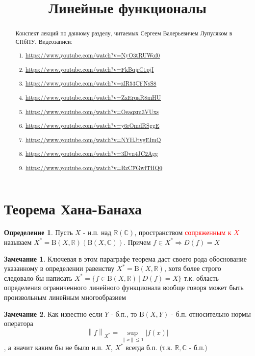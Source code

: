 \documentclass[12pt,a4paper]{article}
\title{Линейные функционалы}
\date{}
\theoremstyle{definition}
\newtheorem{definition}{Определение}[section]
\newtheorem{corollarydf}{Замечание}[definition]
\newcommand{\Real}{\mathbb{R}}
\newcommand{\Cmplx}{\mathbb{C}}
\newcommand{\norm}[1]{\left\lVert#1\right\rVert}
\newcommand{\setbuild}[2]{\{#1\:|\:#2\}}
\newcommand{\bounded}[2]{\textrm{B}(#1, #2)}
\begin{document}
\maketitle

\begin{abstract}
	Конспект лекций по данному разделу, читаемых Сергеем Валерьевичем Лупуляком в СПбПУ. Видеозаписи:
	\begin{enumerate}
		\item \url{https://www.youtube.com/watch?v=NyO3tRUWof0}
		\item \url{https://www.youtube.com/watch?v=FkBqjrC1pjI}
		\item \url{https://www.youtube.com/watch?v=zlR53CFNsS8}
		\item \url{https://www.youtube.com/watch?v=ZxErqaR8mHU}
		\item \url{https://www.youtube.com/watch?v=Oeaqzm3VUxs}
		\item \url{https://www.youtube.com/watch?v=y6rOmdRSggE}
		\item \url{https://www.youtube.com/watch?v=NYHJtvgEImQ}
		\item \url{https://www.youtube.com/watch?v=3Dvn4JC2Agg}
		\item \url{https://www.youtube.com/watch?v=RzCFGwlTHQ0}
	\end{enumerate}
	
\end{abstract}

\newpage

\section{Теорема Хана-Банаха}

\begin{definition}
	Пусть $X$ - н.п. над $\Real(\Cmplx)$, пространством \textcolor{red}{сопряженным к $X$} называем $X^*=\bounded{X}{\Real}(\bounded{X}{\Cmplx})$. Причем $f\in X^*\Rightarrow D(f)=X$
\end{definition}
\begin{corollarydf}
	Ключевая в этом параграфе теорема даст своего рода обоснование указанному в определении равенству $X^*=\bounded{X}{\Real}$, хотя более строго следовало бы написать $X^*=\setbuild{f\in \bounded{X}{\Real}}{D(f)=X}$ т.к. область определения ограниченного линейного функционала вообще говоря может быть произвольным линейным многообразием
\end{corollarydf}
\begin{corollarydf}
	Как известно если $Y$ - б.п., то $\bounded{X}{Y}$ - б.п. относительно нормы оператора $$\norm{f}_{X^*}=\sup_{\norm{x}\leq1}|f(x)|$$, а значит каким бы не было н.п. $X$, $X^*$ всегда б.п. (т.к. $\Real,\Cmplx$ - б.п.)
\end{corollarydf}
\end{document}
